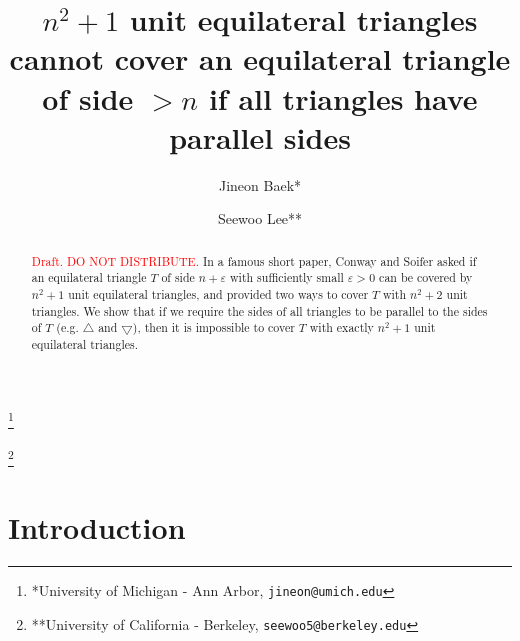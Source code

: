 \documentclass[a4paper]{amsart}
\theoremstyle{plain}
\theoremstyle{definition}
\begin{document}
\title{\(n^2 + 1\) unit equilateral triangles cannot cover an equilateral triangle of side \(> n\) if all triangles have parallel sides}

\author{Jineon Baek*}
\thanks{*University of Michigan - Ann Arbor, \texttt{jineon@umich.edu}}
\author{Seewoo Lee**}
\thanks{**University of California - Berkeley, \texttt{seewoo5@berkeley.edu}}

\begin{abstract}
\textcolor{red}{Draft. DO NOT DISTRIBUTE.}
In a famous short paper, Conway and Soifer asked if an equilateral triangle \(T\) of side \(n + \varepsilon\) with sufficiently small \(\varepsilon > 0\) can be covered by \(n^2 + 1\) unit equilateral triangles, and provided two ways to cover \(T\) with \(n^2 + 2\) unit triangles. We show that if we require the sides of all triangles to be parallel to the sides of \(T\) (e.g. $\bigtriangleup$ and $\bigtriangledown$), then it is impossible to cover \(T\) with exactly \(n^2 + 1\) unit equilateral triangles.
\end{abstract}

\maketitle

\section{Introduction}
\end{document}
